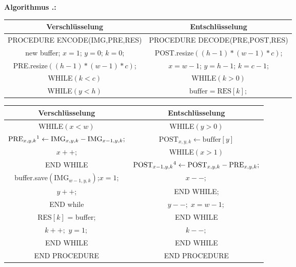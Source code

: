 \documentclass[a4paper,12pt]{article}
\newcounter{Algorithmus}
\newenvironment{Algorithmus}{
\medskip
        
        \setlength{\parindent}{0pt}
        \addtocounter{Algorithmus}{1}
        \textbf{\textsf{Algorithmus \thesubsection.\theAlgorithmus}:}}{
        \nopagebreak
        \vspace{-1.0ex}
        \bigskip
        
}
\begin{document}
\begin{Algorithmus}
\\
\begin{tabular}{c|c}
Verschlüsselung & Entschlüsselung
\\
\hline
PROCEDURE ENCODE(IMG,PRE,RES) & PROCEDURE DECODE(PRE,POST,RES)
\\
new buffer; $x=1$; $y=0$; $k=0$; & POST.resize$((h-1)*(w-1)*c)$;
\\
PRE.resize$((h-1)*(w-1)*c)$; & $x=w-1$; $y=h-1$; $k=c-1$;
\\
WHILE$(k < c)$ &                  WHILE$(k > 0)$
\\
WHILE$(y < h)$ &               $\text{buffer} = \text{RES}[k];$
\end{tabular}
\begin{tabular}{c|c}
Verschlüsselung & Entschlüsselung
\\
\hline
WHILE$(x < w)$ &              WHILE$(y>0)$
\\
$\text{PRE}_{x,y,k}\footnotemark\leftarrow \text{IMG}_{x,y,k} - \text{IMG}_{x-1,y,k};$ &  $\text{POST}_{x,y,k}\leftarrow \text{buffer}[y]$
\\
$x++$; & WHILE$(x>1)$
\\
END WHILE &  $\text{POST}_{x-1,y,k}\footnotemark[4]\leftarrow \text{POST}_{x,y,k} - \text{PRE}_{x,y,k};$
\\
buffer.save$(\text{IMG}_{w-1,y,k})$;\;$x=1$; & $x--;$
\\
$y++$; &  END WHILE; 
\\
END while & $y--;\;x=w-1;$ 
\\
RES$[k]$ = buffer;  & END WHILE 
\\
$k++;$ $y=1;$ &  $k--;$ 
\\
END WHILE  & END WHILE 
\\
END PROCEDURE & END PROCEDURE
\end{tabular}
\end{Algorithmus}
\end{document}
